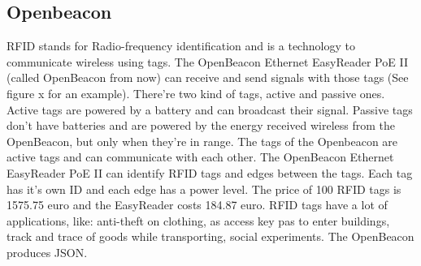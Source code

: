 	\subsection{Openbeacon}
			RFID stands for Radio-frequency identification and is a technology to communicate wireless using tags. The OpenBeacon Ethernet EasyReader PoE II (called OpenBeacon from now) can receive and send signals with those tags (See figure x for an example). There're two kind of tags, active and passive ones. Active tags are powered by a battery and can broadcast their signal. Passive tags don't have batteries and are powered by the energy received wireless from the OpenBeacon, but only when they're in range. The tags of the Openbeacon are active tags and can communicate with each other. The OpenBeacon Ethernet EasyReader PoE II can identify RFID tags and edges between the tags. Each tag has it's own ID and each edge has a power level. The price of 100 RFID tags is 1575.75 euro and the EasyReader costs 184.87 euro. RFID tags have a lot of applications, like: anti-theft on clothing, as access key pas to enter buildings, track and trace of goods while transporting, social experiments\cite{2008arXiv0811.4170B}. The OpenBeacon produces JSON.


